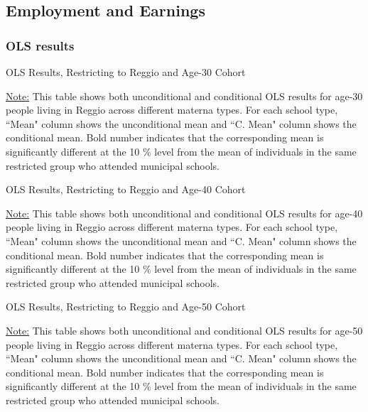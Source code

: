 \documentclass[11pt]{article}
\begin{document}
\subsection{Employment and Earnings}
\subsubsection{OLS results}
\begin{table}[H]
\begin{center}
	\caption{OLS Results, Restricting to Reggio and Age-30 Cohort} \label{table:OLS-R30-W}
	\scalebox{0.68}{
		
	}
	\end{center}
	\footnotesize
\underline{Note:} This table shows both unconditional and conditional OLS results for age-30 people living in Reggio across different materna types. For each school type, ``Mean" column shows the unconditional mean and ``C. Mean" column shows the conditional mean. Bold number indicates that the corresponding mean is significantly different at the 10 \% level from the mean of individuals in the same restricted group who attended municipal schools.

\end{table}

\begin{table}[H]
\begin{center}
	\caption{OLS Results, Restricting to Reggio and Age-40 Cohort} \label{table:OLS-R40-W}
	\scalebox{0.68}{
		
	}
	\end{center}
	\footnotesize
\underline{Note:} This table shows both unconditional and conditional OLS results for age-40 people living in Reggio across different materna types. For each school type, ``Mean" column shows the unconditional mean and ``C. Mean" column shows the conditional mean. Bold number indicates that the corresponding mean is significantly different at the 10 \% level from the mean of individuals in the same restricted group who attended municipal schools.

\end{table}

\begin{table}[H]
\begin{center}
	\caption{OLS Results, Restricting to Reggio and Age-50 Cohort} \label{table:OLS-R50-W}
	\scalebox{0.68}{
		
	}
	\end{center}
	\footnotesize
\underline{Note:} This table shows both unconditional and conditional OLS results for age-50 people living in Reggio across different materna types. For each school type, ``Mean" column shows the unconditional mean and ``C. Mean" column shows the conditional mean. Bold number indicates that the corresponding mean is significantly different at the 10 \% level from the mean of individuals in the same restricted group who attended municipal schools.

\end{table}
\end{document}

